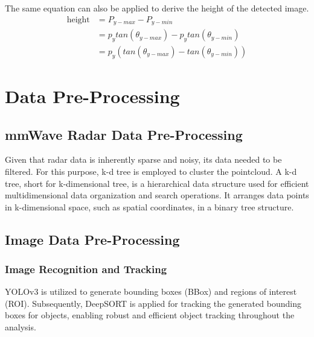 The same equation can also be applied to derive the height of the detected image. 
\begin{equation}\label{equ:2_cam_height}
    \begin{split}
    \text{height}&=P_{y-max}-P_{y-min}\\
                &=p_y tan(\theta_{y-max}) - p_y tan(\theta_{y-min})\\
                &=p_y (tan(\theta_{y-max}) - tan(\theta_{y-min}))
    \end{split}
\end{equation}






\section{Data Pre-Processing}\label{sec:2-preprocessing}
\subsection{mmWave Radar Data Pre-Processing}\label{sec:2-kd_tree}
Given that radar data is inherently sparse and noisy, its data needed to be filtered.
For this purpose, k-d tree is employed to cluster the pointcloud.
A k-d tree, short for k-dimensional tree, is a hierarchical data structure used for efficient multidimensional data organization and search operations. 
It arranges data points in k-dimensional space, such as spatial coordinates, in a binary tree structure. 

\subsection{Image Data Pre-Processing}\label{sec:2-img_recognition}
\subsubsection{Image Recognition and Tracking}
YOLOv3 is utilized to generate bounding boxes (BBox) and regions of interest (ROI)\cite{redmon2018yolov3}.
Subsequently, DeepSORT is applied for tracking the generated bounding boxes for objects, 
enabling robust and efficient object tracking throughout the analysis\cite{Wojke2017simple}.

